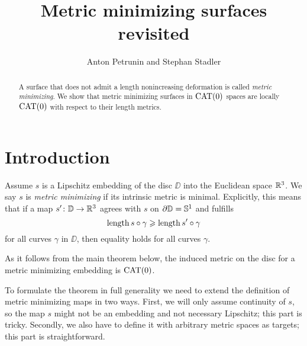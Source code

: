 \documentclass{article}
\begin{document}
\title{Metric minimizing surfaces revisited}
\author{Anton Petrunin and Stephan Stadler}

\newcommand{\Addresses}{{\bigskip\footnotesize
Anton Petrunin, \par\nopagebreak\textsc{Department of Mathematics, PSU, University Park, PA 16802, USA}
\par\nopagebreak
\textit{Email}: \texttt{petrunin@math.psu.edu}

\medskip
 
Stephan Stadler,
\par\nopagebreak\textsc{Mathematisches Institut der Universit\"at M\"unchen, Theresienstr. 39, D-80333 M\"unchen, Germany}
\par\nopagebreak
\textit{Email}: \texttt{stadler@math.lmu.de}
}}

\date{}


\maketitle

\begin{abstract}
A surface that does not admit a length nonincreasing deformation is called \emph{metric minimizing}.
We show that metric minimizing surfaces in $\mathop{\rm CAT}\nolimits(0)$ spaces are locally $\mathop{\rm CAT}\nolimits(0)$ with respect to their length metrics. 
\end{abstract}

\section{Introduction}


Assume $s$ is a Lipschitz embedding of the disc $\DD$ into the Euclidean space $\mathbb{R}^3$.
We say $s$ is \emph{metric minimizing} if its intrinsic metric is minimal. Explicitly, this means that if a map $s'\colon\mathbb{D}\to \mathbb{R}^3$ agrees with 
$s$ on $\partial \mathbb{D}=\mathbb{S}^1$ and fulfills 
\[\mathop{\rm length}\nolimits s\circ\gamma\geqslant \mathop{\rm length}\nolimits s'\circ\gamma\]
for all curves $\gamma$ in $\DD$, then equality holds for all curves $\gamma$.

As it follows from the main theorem below, the induced metric on the disc for a metric minimizing embedding is $\mathop{\rm CAT}\nolimits(0)$.

To formulate the theorem in full generality we need to extend the definition of metric minimizing maps in two ways.
First, we will only assume continuity of $s$, so the map $s$ might not be an embedding and not necessary Lipschitz;
this part is tricky.
Secondly, we also have to define it with arbitrary metric spaces as targets; this part is straightforward. 
\end{document}
